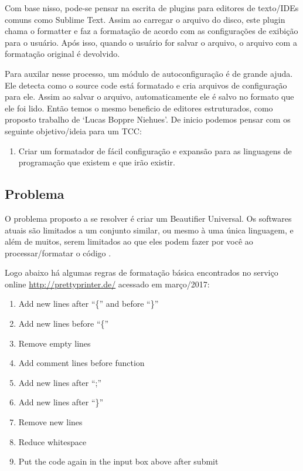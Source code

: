     Com base nisso, pode-se pensar na escrita de plugins para editores de texto/IDEs comuns como
    Sublime Text. Assim ao carregar o arquivo do disco, este plugin chama o formatter e faz a
    formatação de acordo com as configurações de exibição para o usuário. Após isso, quando o
    usuário for salvar o arquivo, o arquivo com a formatação original é devolvido.

    Para auxilar nesse processo, um módulo de autoconfiguração é de grande ajuda. Ele detecta como o
    source code está formatado e cria arquivos de configuração para ele. Assim ao salvar o arquivo,
    automaticamente ele é salvo no formato que ele foi lido. Então temos o mesmo beneficio de
    editores estruturados, como proposto trabalho de `Lucas Boppre Niehues'. De inicio podemos
    pensar com os seguinte objetivo/ideia para um TCC:

    \medskip
    \begin{myquote}
    \begin{enumerate}[nolistsep]
        \item Criar um formatador de fácil configuração e expansão para as linguagens de
              programação que existem e que irão existir.
    \end{enumerate}
    \end{myquote}



\subsection{Problema}

    O problema proposto a se resolver é criar um Beautifier Universal. Os softwares atuais são
    limitados a um conjunto similar, ou mesmo à uma única linguagem, e além de muitos, serem
    limitados ao que eles podem fazer por você ao processar/formatar o código \cite{universalCodeFormatter}.

    Logo abaixo há algumas regras de formatação básica encontrados no serviço online
    \url{http://prettyprinter.de/} acessado em março/2017:

    \medskip
    \begin{myquote}
    \begin{enumerate}[nolistsep]
        \item Add new lines after ``\{'' and before ``\}''
        \item Add new lines before ``\{''
        \item Remove empty lines
        \item Add comment lines before function
        \item Add new lines after ``;''
        \item Add new lines after ``\}''
        \item Remove new lines
        \item Reduce whitespace
        \item Put the code again in the input box above after submit
    \end{enumerate}
    \end{myquote}

